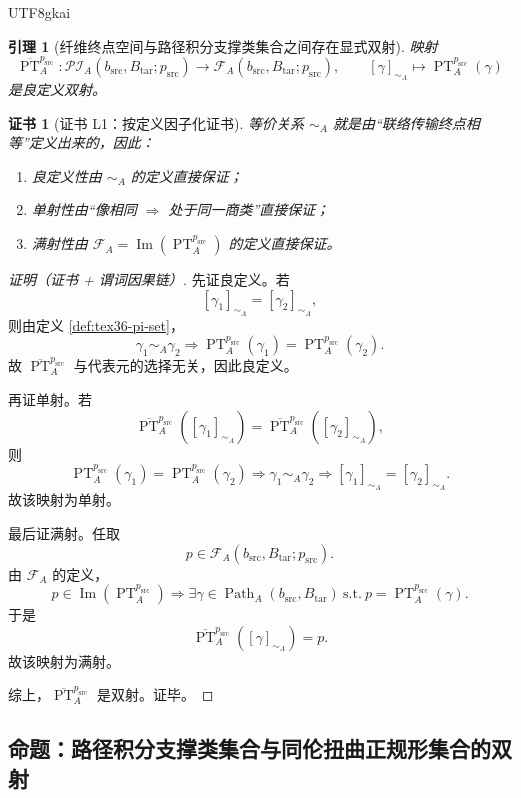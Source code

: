 \documentclass[12pt]{article}
\newtheorem{lemma}{引理}[section]
\newtheorem{Certificate}{证书}[section]
\newcommand{\Path}{\operatorname{Path}}
\newcommand{\PT}{\operatorname{PT}}
\newcommand{\Img}{\operatorname{Im}}
\begin{document}
\begin{CJK*}{UTF8}{gkai}
\begin{lemma}[纤维终点空间与路径积分支撑类集合之间存在显式双射]
\label{lem:tex36-fiber-pi}
映射
\[
  \overline{\PT}_A^{p_{\mathrm{src}}}:
  \mathcal{PI}_{A}(b_{\mathrm{src}},B_{\mathrm{tar}};p_{\mathrm{src}})
  \to
  \mathcal{F}_{A}(b_{\mathrm{src}},B_{\mathrm{tar}};p_{\mathrm{src}}),
  \qquad
  [\gamma]_{\sim_A}\mapsto \PT_A^{p_{\mathrm{src}}}(\gamma)
\]
是良定义双射。
\end{lemma}

\begin{Certificate}[证书 L1：按定义因子化证书]
\label{cert:tex36-l1}
等价关系 $\sim_A$ 就是由“联络传输终点相等”定义出来的，因此：
\begin{enumerate}
  \item 良定义性由 $\sim_A$ 的定义直接保证；
  \item 单射性由“像相同 $\Rightarrow$ 处于同一商类”直接保证；
  \item 满射性由 $\mathcal{F}_A=\Img(\PT_A^{p_{\mathrm{src}}})$ 的定义直接保证。
\end{enumerate}
\end{Certificate}

\begin{proof}[证明（证书 + 谓词因果链）]
先证良定义。若
\[
  [\gamma_1]_{\sim_A}=[\gamma_2]_{\sim_A},
\]
则由定义 \ref{def:tex36-pi-set}，
\[
  \gamma_1\sim_A \gamma_2
  \Rightarrow
  \PT_A^{p_{\mathrm{src}}}(\gamma_1)=\PT_A^{p_{\mathrm{src}}}(\gamma_2).
\]
故 $\overline{\PT}_A^{p_{\mathrm{src}}}$ 与代表元的选择无关，因此良定义。

再证单射。若
\[
  \overline{\PT}_A^{p_{\mathrm{src}}}([\gamma_1]_{\sim_A})
  =
  \overline{\PT}_A^{p_{\mathrm{src}}}([\gamma_2]_{\sim_A}),
\]
则
\[
  \PT_A^{p_{\mathrm{src}}}(\gamma_1)
  =
  \PT_A^{p_{\mathrm{src}}}(\gamma_2)
  \Rightarrow
  \gamma_1\sim_A \gamma_2
  \Rightarrow
  [\gamma_1]_{\sim_A}=[\gamma_2]_{\sim_A}.
\]
故该映射为单射。

最后证满射。任取
\[
  p\in \mathcal{F}_{A}(b_{\mathrm{src}},B_{\mathrm{tar}};p_{\mathrm{src}}).
\]
由 $\mathcal{F}_A$ 的定义，
\[
  p\in\Img(\PT_A^{p_{\mathrm{src}}})
  \Rightarrow
  \exists \gamma\in \Path_A(b_{\mathrm{src}},B_{\mathrm{tar}})
  \ \text{s.t.}\
  p=\PT_A^{p_{\mathrm{src}}}(\gamma).
\]
于是
\[
  \overline{\PT}_A^{p_{\mathrm{src}}}([\gamma]_{\sim_A})=p.
\]
故该映射为满射。

综上，$\overline{\PT}_A^{p_{\mathrm{src}}}$ 是双射。证毕。
\end{proof}

\subsection{命题：路径积分支撑类集合与同伦扭曲正规形集合的双射}
\label{subsec:tex36-proposition}


\end{CJK*}
\end{document}
